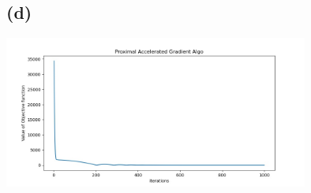 \documentclass[12pt, a4 paper]{article}
\begin{document}
\begin{framed}
        \subsection{(d)}
        {\centering
        \includegraphics[width=10cm, height=5cm]{Q10_4.jpg}
        }
    \end{framed}
\end{document}
